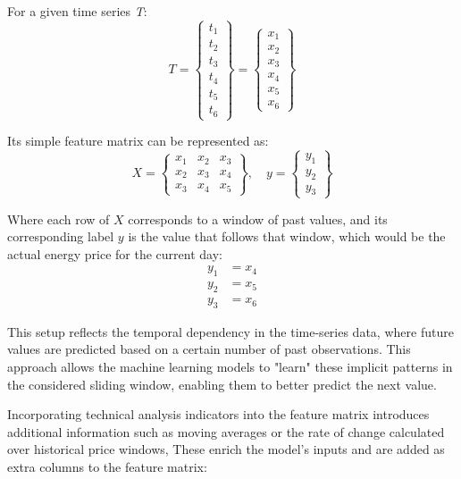 \documentclass[12pt]{report} %
\begin{document}
For a given time series \textit{T}:
\begin{equation*}
{T} = \begin{Bmatrix}
t_1 \\
t_2 \\
t_3 \\
t_4 \\
t_5 \\
t_6
\end{Bmatrix} = \begin{Bmatrix}
x_1 \\
x_2 \\
x_3 \\
x_4 \\
x_5 \\
x_6
\end{Bmatrix}
\end{equation*}

Its simple feature matrix can be represented as:
\begin{equation*}
{X} = \begin{Bmatrix}
x_1 & x_2 & x_3 \\
x_2 & x_3 & x_4 \\
x_3 & x_4 & x_5
\end{Bmatrix}, \quad
{y} = \begin{Bmatrix}
y_1 \\
y_2 \\
y_3
\end{Bmatrix}
\end{equation*}

Where each row of $\mathit{X}$ corresponds to a window of past values, and its corresponding label $\mathit{y}$ is the value that follows that window, which would be the actual energy price for the current day:
\begin{align*}
y_1 &= x_4 \\
y_2 &= x_5 \\
y_3 &= x_6
\end{align*}

This setup reflects the temporal dependency in the time-series data, where future values are predicted based on a certain number of past observations. This approach allows the machine learning models to "learn" these implicit patterns in the considered sliding window, enabling them to better predict the next value.

Incorporating technical analysis indicators into the feature matrix introduces additional information such as moving averages or the rate of change calculated over historical price windows, These enrich the model’s inputs and are added as extra columns to the feature matrix:
\end{document}
